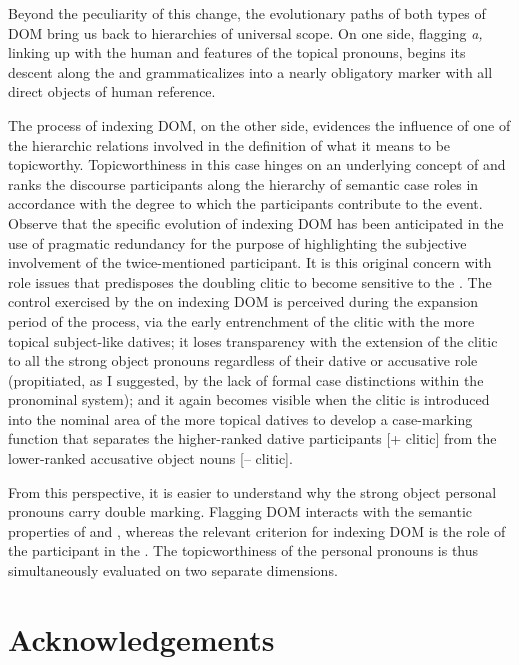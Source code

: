 \documentclass[output=paper]{LSP/langsci}
\begin{document}
 Beyond the peculiarity of this change, the evolutionary paths of both types of DOM bring us back to hierarchies of universal scope. On one side, flagging \textit{a,} linking up with the human and  features of the topical pronouns, begins its descent along the  and grammaticalizes into a nearly obligatory marker with all direct objects of human reference. 

 The  process of indexing DOM, on the other side, evidences the influence of one of the hierarchic relations involved in the definition of what it means to be topicworthy. Topicworthiness in this case hinges on an underlying concept of  and ranks the discourse participants along the hierarchy of semantic case roles in accordance with the degree to which the participants contribute to the event. Observe that the specific evolution of indexing DOM has been anticipated in the use of pragmatic redundancy for the purpose of highlighting the subjective involvement of the twice-mentioned participant. It is this original concern with role issues that predisposes the doubling clitic to become sensitive to the . The control exercised by the  on  indexing DOM is perceived during the expansion period of the  process, via the early entrenchment of the clitic with the more topical subject-like datives; it loses transparency with the extension of the clitic to all the strong object pronouns regardless of their dative or accusative role (propitiated, as I suggested, by the lack of formal case distinctions within the  pronominal system); and it again becomes visible when the clitic is introduced into the nominal area of the more topical datives to develop a case-marking function that separates the higher-ranked dative participants [+ clitic] from the lower-ranked accusative object nouns [– clitic].

 From this perspective, it is easier to understand why the strong object personal pronouns carry double marking. Flagging DOM interacts with the semantic properties of  and , whereas the relevant criterion for indexing DOM is the role of the participant in the . The topicworthiness of the personal pronouns is thus simultaneously evaluated on two separate dimensions.

\section*{Acknowledgements}
\end{document}
